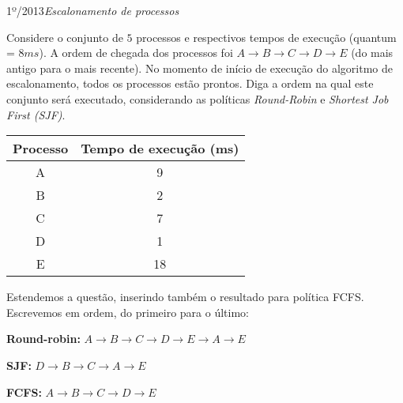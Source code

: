 \begin{exercicio}
  {1º/2013}{\textit{Escalonamento de processos}}
  {Considere o conjunto de $5$ processos e respectivos tempos de execução (quantum = $8 ms$). A ordem de chegada dos processos foi $A \rightarrow B \rightarrow C \rightarrow D \rightarrow E$ (do mais antigo para o mais recente). No momento de início de execução do algoritmo de escalonamento, todos os processos estão prontos. Diga a ordem na qual este conjunto será executado, considerando as políticas \textit{Round-Robin} e \textit{Shortest Job First (SJF)}.
  \begin{table}[H]
    \centering
    \begin{tabular}{cc}
      \hline \hline
      \textbf{Processo} & \textbf{Tempo de execução (ms)} \\ \hline
      A                 & 9                               \\
      B                 & 2                              \\
      C                 & 7                               \\
      D                 & 1                               \\
      E                 & 18                              \\ \hline \hline
    \end{tabular}
  \end{table}
  } %

  Estendemos a questão, inserindo também o resultado para política FCFS. Escrevemos em ordem, do primeiro para o último:

  \textbf{Round-robin:} $A \rightarrow B \rightarrow C \rightarrow D \rightarrow E \rightarrow A \rightarrow E$

  \textbf{SJF:} $D \rightarrow B \rightarrow C \rightarrow A \rightarrow E$

  \textbf{FCFS:} $A \rightarrow B \rightarrow C \rightarrow D \rightarrow E$
\end{exercicio}

